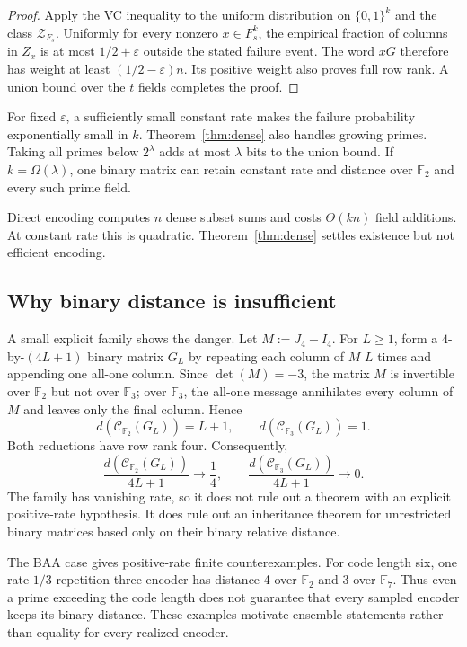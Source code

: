 \documentclass[runningheads,envcountsame,envcountsect]{llncs}
\newcommand{\F}{\mathbb F}
\newcommand{\cC}{\mathcal C}
\newcommand{\cZ}{\mathcal Z}
\begin{document}
\begin{proof}
Apply the VC inequality to the uniform distribution on $\{0,1\}^k$ and the
class $\cZ_{F_s}$.  Uniformly for every nonzero $x\in F_s^k$, the empirical
fraction of columns in $Z_x$ is at most $1/2+\varepsilon$ outside the stated
failure event.  The word $xG$ therefore has weight at least
$(1/2-\varepsilon)n$.  Its positive weight also proves full row rank.  A union
bound over the $t$ fields completes the proof.
\end{proof}

For fixed $\varepsilon$, a sufficiently small constant rate makes the failure
probability exponentially small in $k$.  Theorem~\ref{thm:dense} also handles
growing primes.  Taking all primes below $2^\lambda$ adds at most $\lambda$
bits to the union bound.  If $k=\Omega(\lambda)$, one binary matrix can retain
constant rate and distance over $\F_2$ and every such prime field.

Direct encoding computes $n$ dense subset sums and costs $\Theta(kn)$ field
additions.  At constant rate this is quadratic.  Theorem~\ref{thm:dense}
settles existence but not efficient encoding.

\subsection{Why binary distance is insufficient}

A small explicit family shows the danger.  Let $M:=J_4-I_4$.  For $L\ge1$,
form a $4$-by-$(4L+1)$ binary matrix $G_L$ by repeating each column of $M$
$L$ times and appending one all-one column.  Since $\det(M)=-3$, the
matrix $M$ is invertible over $\F_2$ but not over $\F_3$; over $\F_3$,
the all-one message annihilates every column of $M$ and leaves only the
final column.  Hence
\[
  d(\cC_{\F_2}(G_L))=L+1,
  \qquad
  d(\cC_{\F_3}(G_L))=1.
\]
Both reductions have row rank four.  Consequently,
\[
  \frac{d(\cC_{\F_2}(G_L))}{4L+1}\longrightarrow\frac14,
  \qquad
  \frac{d(\cC_{\F_3}(G_L))}{4L+1}\longrightarrow0.
\]
The family has vanishing rate, so it does not rule out a theorem with an
explicit positive-rate hypothesis.  It does rule out an inheritance theorem
for unrestricted binary matrices based only on their binary relative distance.

The BAA case gives positive-rate finite counterexamples.  For code length
six, one rate-$1/3$ repetition-three encoder has distance 4 over $\F_2$ and
3 over $\F_7$.  Thus even a prime exceeding the code length does not
guarantee that every sampled encoder keeps its binary distance.  These examples
motivate ensemble statements rather than equality for every realized encoder.
\end{document}
